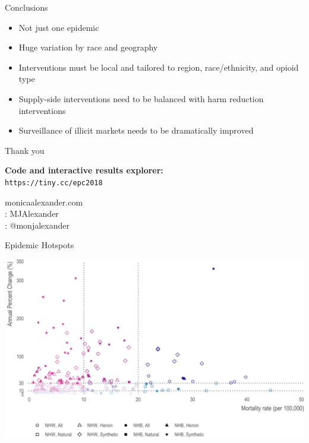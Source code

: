 \documentclass[ignorenonframetext,compress]{beamer}
\providecommand{\tightlist}{%
  \setlength{\itemsep}{0pt}\setlength{\parskip}{0pt}}
\begin{document}
\begin{frame}{Conclusions}

\begin{itemize}
\tightlist
\item
  Not just one epidemic
\item
  Huge variation by race and geography
\item
  Interventions must be local and tailored to region, race/ethnicity,
  and opioid type
\item
  Supply-side interventions need to be balanced with harm reduction
  interventions 
\item
  Surveillance of illicit markets needs to be dramatically improved 
\end{itemize}

\end{frame}

\begin{frame}{Thank you}

\Large

\begin{center}
\textbf{Code and interactive results explorer:} \\ \texttt{https://tiny.cc/epc2018} \newline \newline

 monicaalexander.com \\
\faGithub: MJAlexander \\
\faTwitter: @monjalexander

\end{center}

\end{frame}

\begin{frame}{Epidemic Hotspots}

\includegraphics{epc_slides_files/figure-beamer/unnamed-chunk-11-1.pdf}

\end{frame}
\end{document}
